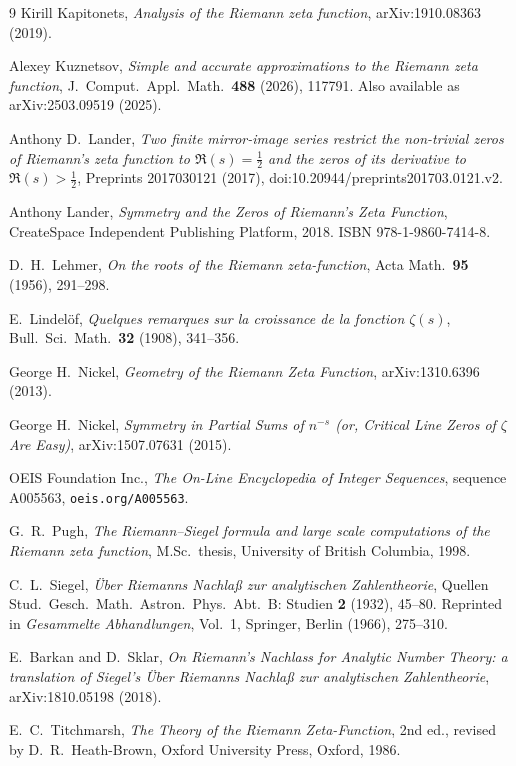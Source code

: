 \documentclass[11pt]{article}
\theoremstyle{definition}
\begin{document}
\begin{thebibliography}{9}
Kirill Kapitonets, \emph{Analysis of the Riemann zeta function},
arXiv:1910.08363 (2019).

Alexey Kuznetsov, \emph{Simple and accurate approximations to the Riemann
zeta function}, J.\ Comput.\ Appl.\ Math.\ \textbf{488} (2026), 117791.
Also available as arXiv:2503.09519 (2025).

Anthony D.\ Lander, \emph{Two finite mirror-image series restrict the
non-trivial zeros of Riemann's zeta function to $\Re(s)=\tfrac12$ and the zeros
of its derivative to $\Re(s)>\tfrac12$}, Preprints 2017030121 (2017),
doi:10.20944/preprints201703.0121.v2.

Anthony Lander, \emph{Symmetry and the Zeros of Riemann's Zeta Function},
CreateSpace Independent Publishing Platform, 2018.
ISBN 978-1-9860-7414-8.

D.~H.\ Lehmer, \emph{On the roots of the Riemann zeta-function},
Acta Math.\ \textbf{95} (1956), 291--298.

E.~Lindel\"of, \emph{Quelques remarques sur la croissance de la fonction
$\zeta(s)$}, Bull.\ Sci.\ Math.\ \textbf{32} (1908), 341--356.

George H.\ Nickel, \emph{Geometry of the Riemann Zeta Function},
arXiv:1310.6396 (2013).

George H.\ Nickel, \emph{Symmetry in Partial Sums of $n^{-s}$ (or, Critical Line
Zeros of $\zeta$ Are Easy)}, arXiv:1507.07631 (2015).

OEIS Foundation Inc., \emph{The On-Line Encyclopedia of Integer Sequences},
sequence A005563, \texttt{oeis.org/A005563}.

G.~R.\ Pugh, \emph{The Riemann--Siegel formula and large scale computations
of the Riemann zeta function}, M.Sc.\ thesis, University of British
Columbia, 1998.

C.~L.\ Siegel, \emph{\"Uber Riemanns Nachla\ss{} zur analytischen
Zahlentheorie}, Quellen Stud.\ Gesch.\ Math.\ Astron.\ Phys.\ Abt.\ B:
Studien \textbf{2} (1932), 45--80. Reprinted in \emph{Gesammelte
Abhandlungen}, Vol.~1, Springer, Berlin (1966), 275--310.

E.~Barkan and D.~Sklar, \emph{On Riemann's Nachlass for Analytic Number
Theory: a translation of Siegel's \"Uber Riemanns Nachla\ss{} zur
analytischen Zahlentheorie}, arXiv:1810.05198 (2018).

E.~C.\ Titchmarsh, \emph{The Theory of the Riemann Zeta-Function}, 2nd ed.,
revised by D.~R.\ Heath-Brown, Oxford University Press, Oxford, 1986.

\end{thebibliography}
\end{document}
